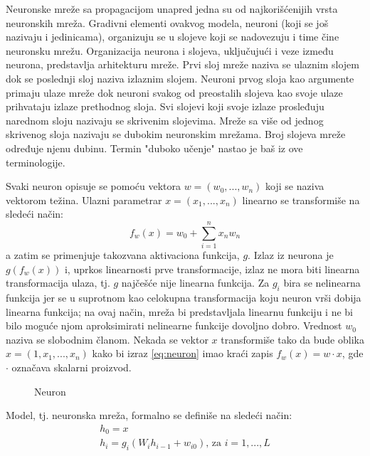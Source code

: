 Neuronske mreže sa propagacijom unapred jedna su od najkorišćenijih vrsta neuronskih mreža. Gradivni elementi ovakvog modela, neuroni (koji se još nazivaju i jedinicama), organizuju se u slojeve koji se nadovezuju i time čine neuronsku mrežu. Organizacija neurona i slojeva, uključujući i veze između neurona, predstavlja arhitekturu mreže. Prvi sloj mreže naziva se ulaznim slojem dok se poslednji sloj naziva izlaznim slojem. Neuroni prvog sloja kao argumente primaju ulaze mreže dok neuroni svakog od preostalih slojeva kao svoje ulaze prihvataju izlaze prethodnog sloja. Svi slojevi koji svoje izlaze prosleđuju narednom sloju nazivaju se skrivenim slojevima. Mreže sa više od jednog skrivenog sloja nazivaju se dubokim neuronskim mrežama.  Broj slojeva mreže određuje njenu dubinu. Termin "duboko učenje" nastao je baš iz ove terminologije.


\par
Svaki neuron opisuje se pomoću vektora $w = (w_0, ..., w_n)$ koji se naziva vektorom težina. Ulazni parametrar $x = (x_1, ..., x_n)$ linearno se transformiše na sledeći način:
\begin{equation}
\label{eq:neuron}
		f_w(x) = w_0 + \sum_{i=1}^{n} x_nw_n 
\end{equation}
a zatim se primenjuje takozvana aktivaciona funkcija, $g$. Izlaz iz neurona je $g(f_w(x))$ i, uprkos linearnosti prve transformacije, izlaz ne mora biti linearna transformacija ulaza, tj. $g$ najčešće nije linearna funkcija. Za $g_i$ bira se nelinearna funkcija jer se u suprotnom kao celokupna transformacija koju neuron vrši dobija linearna funkcija; na ovaj način, mreža bi predstavljala linearnu funkciju i ne bi bilo moguće njom aproksimirati nelinearne funkcije dovoljno dobro. Vrednost $w_0$ naziva se slobodnim članom. Nekada se vektor $x$ transformiše tako da bude oblika $x = (1, x_1, ..., x_n)$ kako bi izraz \eqref{eq:neuron} imao kraći zapis $f_w(x) = w \cdot x$, gde $\cdot$ označava skalarni proizvod.\\

\begin{figure}
	\centering
	\resizebox{.5\linewidth}{!}{}
	\caption{Neuron}
	\label{fig:neuron}
\end{figure}

Model, tj. neuronska mreža, formalno se definiše na sledeći način:
\begin{equation}
	\begin{gathered}
		h_0 = x  \\
	 	h_i = g_i(W_ih_{i-1} + w_{i0}) \text{,~za~} i=1, ..., L
	\end{gathered}
\end{equation}

